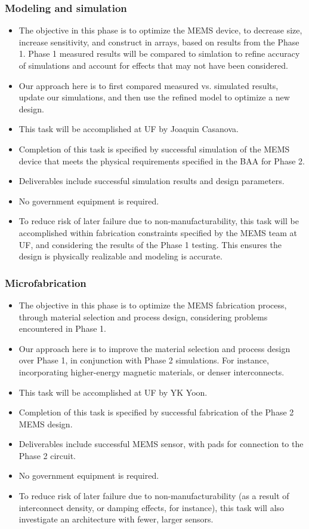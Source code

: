 \subsubsection{Modeling and simulation}\label{sec:p2:em}
\begin{itemize}
\item The objective in this phase is to optimize the MEMS device, to decrease size, increase sensitivity, and construct in arrays, based on results from the Phase 1. Phase 1 measured results will be compared to simlation to refine accuracy of simulations and account for effects that may not have been considered.
\item Our approach here is to first compared measured vs. simulated results, update our simulations, and then use the refined model to optimize a new design.
\item This task will be accomplished at UF by Joaquin Casanova.
\item Completion of this task is specified by successful simulation of the MEMS device that meets the physical requirements specified in the BAA for Phase 2.
\item Deliverables include successful simulation results and design parameters.
\item No government equipment is required.
\item To reduce risk of later failure due to non-manufacturability, this task will be accomplished within fabrication constraints specified by the MEMS team at UF, and considering the results of the Phase 1 testing. This ensures the design is physically realizable and modeling is accurate.
\end{itemize}
\subsubsection{Microfabrication}\label{sec:p2:mf}
\begin{itemize}
\item The objective in this phase is to optimize the MEMS fabrication process, through material selection and process design, considering problems encountered in Phase 1.
\item Our approach here is to improve the material selection and process design over Phase 1, in conjunction with Phase 2 simulations. For instance, incorporating higher-energy magnetic materials, or denser interconnects.
\item This task will be accomplished at UF by YK Yoon.
\item Completion of this task is specified by successful fabrication of the Phase 2 MEMS design.
\item Deliverables include successful MEMS sensor, with pads for connection to the Phase 2 circuit.
\item No government equipment is required.
\item To reduce risk of later failure due to non-manufacturability (as a result of interconnect density, or damping effects, for instance), this task will also investigate an architecture with fewer, larger sensors.
\end{itemize}
